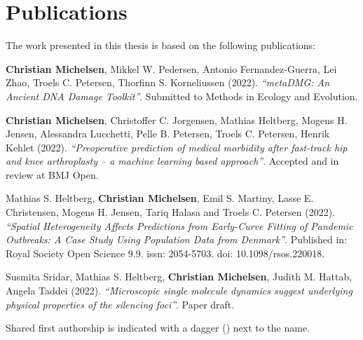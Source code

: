 \chapter{Publications}

The work presented in this thesis is based on the following publications:

\vspace{1.5cm}

\begin{description} [labelindent=1cm,style=multiline,leftmargin=3cm]
    \item [Paper 1:] \textbf{Christian Michelsen}\textsuperscript{\textdagger}, Mikkel W. Pedersen\textsuperscript{\textdagger}, Antonio Fernandez-Guerra, Lei Zhao, Troels C. Petersen, Thorfinn S. Korneliussen (2022). \emph{``metaDMG: An Ancient DNA Damage Toolkit''}. Submitted to Methods in Ecology and Evolution. \\
    \item [Paper 2:] \textbf{Christian Michelsen}\textsuperscript{\textdagger}, Christoffer C. Jorgensen\textsuperscript{\textdagger}, Mathias Heltberg, Mogens H. Jensen, Alessandra Lucchetti, Pelle B. Petersen, Troels C. Petersen, Henrik Kehlet (2022). \emph{``Preoperative prediction of medical morbidity after fast-track hip and knee arthroplasty -- a machine learning based approach''}. Accepted and in review at BMJ Open. \\
    \item [Paper 3:] Mathias S. Heltberg\textsuperscript{\textdagger}, \textbf{Christian Michelsen}\textsuperscript{\textdagger}, Emil S. Martiny, Lasse E. Christensen, Mogens H. Jensen, Tariq Halasa and Troels C. Petersen (2022). \emph{``Spatial Heterogeneity Affects Predictions from Early-Curve Fitting of Pandemic Outbreaks: A Case Study Using Population Data from Denmark''}. Published in: Royal Society Open Science 9.9. issn: 2054-5703. doi: 10.1098/rsos.220018. \\
    \item [Paper 4:] Susmita Sridar\textsuperscript{\textdagger}, Mathias S. Heltberg\textsuperscript{\textdagger}, \textbf{Christian Michelsen}\textsuperscript{\textdagger}, Judith M. Hattab, Angela Taddei (2022). \emph{``Microscopic single molecule dynamics suggest underlying physical properties of the silencing foci''}. Paper draft.
\end{description}

\vspace{1cm}
\noindent Shared first authorship is indicated with a dagger (\textdagger) next to the name.

